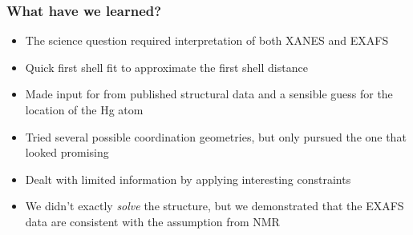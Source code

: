 \documentclass[10pt, xcolor=x11names, compress]{beamer}
\begin{document}
\begin{frame}
  \frametitle{What have we learned?}
  \begin{itemize}
  \item The science question required interpretation of both XANES and
    EXAFS
  \item Quick first shell fit to approximate the first shell distance
  \item Made input for {\feff} from published structural data and a
    sensible guess for the location of the Hg atom
  \item Tried several possible coordination geometries, but only
    pursued the one that looked promising
  \item Dealt with limited information by applying interesting
    constraints
  \item We didn't exactly \textit{solve} the structure, but we
    demonstrated that the EXAFS data are consistent with the
    assumption from NMR
  \end{itemize}
\end{frame}
\end{document}
